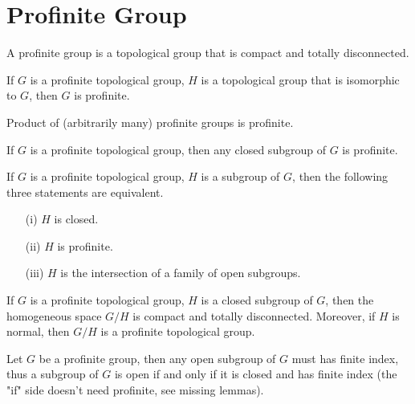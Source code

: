\chapter{Profinite Group}

\begin{definition}
	\label{def-profinite-group}
	\leanok
	A profinite group is a topological group that is compact and totally disconnected.
\end{definition}

\begin{lemma}
	\label{lemma-profinite-of-continuousmulequiv}
	\leanok
	If $G$ is a profinite topological group, $H$ is a topological group that is isomorphic to $G$, then $G$ is profinite.
\end{lemma}

\begin{theorem}
	\label{theorem-profinite-product-profinite}
	\leanok
	Product of (arbitrarily many) profinite groups is profinite.
\end{theorem}

\begin{theorem}
	\label{theorem-profinite-closed-subgroup-profinite}
	\leanok
	If $G$ is a profinite topological group, then any closed subgroup of $G$ is profinite.
\end{theorem}

\begin{theorem}
	If $G$ is a profinite topological group, $H$ is a subgroup of $G$, then the following three statements
	are equivalent.
	\begin{itemize}
		\item[(i)] $ H $ is closed.
		\item[(ii)] $ H $ is profinite.
		\item[(iii)] $ H $ is the intersection of a family of open subgroups.
	\end{itemize}
\end{theorem}

\begin{lemma}
	If $G$ is a profinite topological group, $H$ is a closed subgroup of $G$, then the homogeneous space $G / H$ is compact and totally disconnected. Moreover, if $H$ is normal, then $G / H$ is a profinite topological group.
\end{lemma}

\begin{lemma}
	\label{lemma-profinite-open-subgroup-finite-index}
	\leanok
	Let $ G $ be a profinite group, then any open subgroup of $ G $ must has finite index, thus a subgroup of $ G $ is open if and only if it is closed and has finite index (the "if" side doesn't need profinite, see missing lemmas).
\end{lemma}

